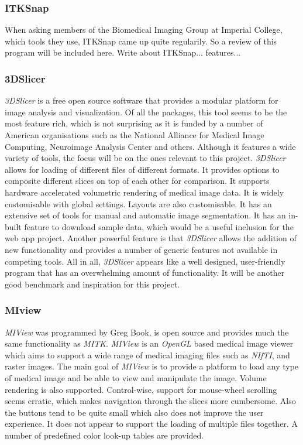 \documentclass[a4paper,11pt,titlepage]{article}
\begin{document}
\subsubsection{ITKSnap}

When asking members of the Biomedical Imaging Group at Imperial College, which tools they use, ITKSnap came up quite regularily. So a review of this program will be included here.
Write about ITKSnap... features...


\subsubsection{3DSlicer}
\textit{3DSlicer} is a free open source software that provides a modular platform for image analysis and visualization. Of all the packages, this tool seems to be the most feature rich, which is not surprising as it is funded by a number of American organisations such as  the National Alliance for Medical Image Computing, Neuroimage Analysis Center and others. Although it features a wide variety of tools, the focus will be on the ones relevant to this project. \textit{3DSlicer} allows for loading of different files of different formats. It provides options to composite different slices on top of each other for comparison. It supports hardware accelerated volumetric rendering of medical image data. It is widely customisable with global settings. Layouts are also customisable. It has an extensive set of tools for manual and automatic image segmentation. It has an in-built feature to download sample data, which would be a useful inclusion for the web app project. Another powerful feature is that \textit{3DSlicer} allows the addition of new functionality and provides a number of generic features not available in competing tools. All in all, \textit{3DSlicer} appears like a well designed, user-friendly program that has an overwhelming amount of functionality. It will be another good benchmark and inspiration for this project.

\subsubsection{MIview}
\textit{MIView} was programmed by Greg Book, is open source and provides much the same functionality as \textit{MITK}. \textit{MIView} is an \textit{OpenGL} based medical image viewer which aims to support a wide range of medical imaging files such as \textit{NIfTI}, and raster images. The main goal of \textit{MIView} is to provide a platform to load any type of medical image and be able to view and manipulate the image. Volume rendering is also supported. Control-wise, support for mouse-wheel scrolling seems erratic, which makes navigation through the slices more cumbersome. Also the buttons tend to be quite small which also does not improve the user experience. It does not appear to support the loading of multiple files together. A number of predefined color look-up tables are provided.
\end{document}

